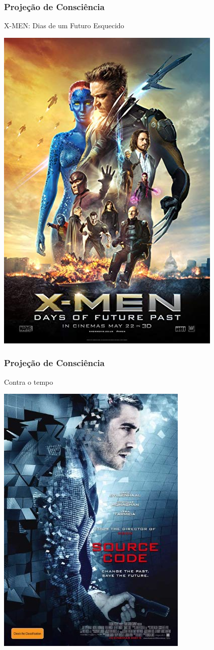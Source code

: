 \begin{frame}
    \frametitle{Projeção de Consciência}
    
    \alert{X-MEN: Dias de um Futuro Esquecido}

    \includegraphics[height=0.8\textheight]{img/posters/xmen_dofp.jpg}
\end{frame}

\begin{frame}
    \frametitle{Projeção de Consciência}
    
    \alert{Contra o tempo}

    \includegraphics[height=0.8\textheight]{img/posters/source_code.jpeg}
\end{frame}
